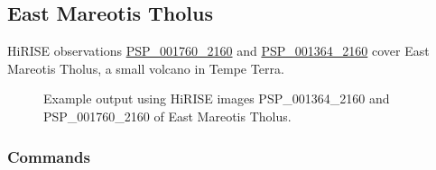 \subsection{East Mareotis Tholus}

\ac{HiRISE} observations
\href{http://hirise.lpl.arizona.edu/PSP_001760_2160}{PSP\_001760\_2160} and
\href{http://hirise.lpl.arizona.edu/PSP_001364_2160}{PSP\_001364\_2160} 
cover East Mareotis Tholus, a small volcano in Tempe Terra.

\begin{figure}[h!]
\centering
  \hfil
\caption{Example output using HiRISE images PSP\_001364\_2160 and
  PSP\_001760\_2160 of East Mareotis Tholus.}
\label{fig:hirise_emare_example}
\end{figure}

\subsubsection*{Commands}

